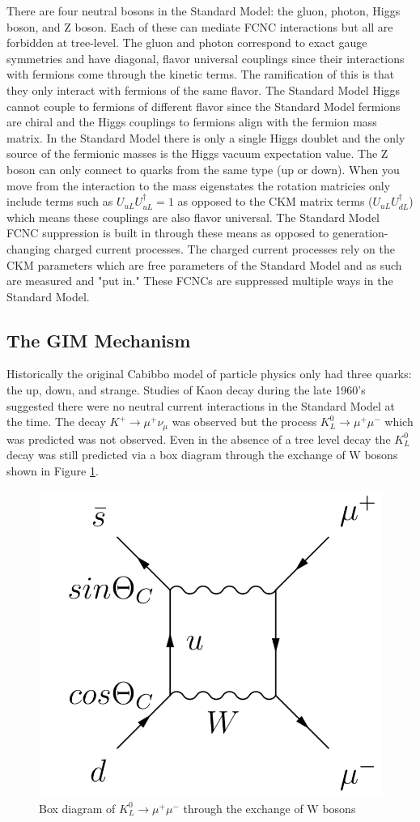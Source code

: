 There are four neutral bosons in the Standard Model: the gluon, photon, Higgs boson, and Z boson.  Each of these can mediate FCNC interactions but all are forbidden at tree-level.  The gluon and photon correspond to exact gauge symmetries and have diagonal, flavor universal couplings since their interactions with fermions come through the kinetic terms.  The ramification of this is that they only interact with fermions of the same flavor.  The Standard Model Higgs cannot couple to fermions of different flavor since the Standard Model fermions are chiral and the Higgs couplings to fermions align with the fermion mass matrix.  In the Standard Model there is only a single Higgs doublet and the only source of the fermionic masses is the Higgs vacuum expectation value.  The Z boson can only connect to quarks from the same type (up or down).  When you move from the interaction to the mass eigenstates the rotation matricies only include terms such as $U_{uL}U_{uL}^\dagger = 1$ as opposed to the CKM matrix terms ($U_{uL}U_{dL}^\dagger$) which means these couplings are also flavor universal. 
The Standard Model FCNC suppression is built in through these means as opposed to generation-changing charged current processes.  The charged current processes rely on the CKM parameters which are free parameters of the Standard Model and as such are measured and "put in."  These FCNCs are suppressed multiple ways in the Standard Model.

\subsection{The GIM Mechanism}
Historically the original Cabibbo model of particle physics only had three quarks: the up, down, and strange.  Studies of Kaon decay during the late 1960's suggested there were no neutral current interactions in the Standard Model at the time.  The decay $K^+ \rightarrow \mu^+ \nu_\mu$ was observed but the process $K_L^0 \rightarrow \mu^+ \mu^- $ which was predicted was not observed.  Even in the absence of a tree level decay the $K_L^0$ decay was still predicted via a box diagram through the exchange of W bosons shown in Figure \ref{fig:KaonBox}.

\begin{figure}[h!]
	\centering
	\includegraphics[width=.4\columnwidth]{../ThesisImages/Theory/GIMDiagramsa.png}
	\caption{Box diagram of $K_L^0 \rightarrow \mu^+ \mu^-$ through the exchange of W bosons}
	\label{fig:KaonBox}
\end{figure}

